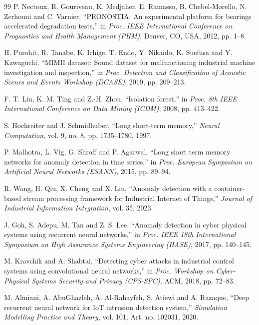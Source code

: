 \begin{thebibliography}{99}
 P. Nectoux, R. Gouriveau, K. Medjaher, E. Ramasso, B. Chebel-Morello, N. Zerhouni and C. Varnier, ``PRONOSTIA: An experimental platform for bearings accelerated degradation tests,'' in \emph{Proc. IEEE International Conference on Prognostics and Health Management (PHM)}, Denver, CO, USA, 2012, pp. 1--8.

 H. Purohit, R. Tanabe, K. Ichige, T. Endo, Y. Nikaido, K. Suefusa and Y. Kawaguchi, ``MIMII dataset: Sound dataset for malfunctioning industrial machine investigation and inspection,'' in \emph{Proc. Detection and Classification of Acoustic Scenes and Events Workshop (DCASE)}, 2019, pp. 209--213.

 F. T. Liu, K. M. Ting and Z.-H. Zhou, ``Isolation forest,'' in \emph{Proc. 8th IEEE International Conference on Data Mining (ICDM)}, 2008, pp. 413--422.

 S. Hochreiter and J. Schmidhuber, ``Long short-term memory,'' \emph{Neural Computation}, vol. 9, no. 8, pp. 1735--1780, 1997.

 P. Malhotra, L. Vig, G. Shroff and P. Agarwal, ``Long short term memory networks for anomaly detection in time series,'' in \emph{Proc. European Symposium on Artificial Neural Networks (ESANN)}, 2015, pp. 89--94.

 R. Wang, H. Qiu, X. Cheng and X. Liu, ``Anomaly detection with a container-based stream processing framework for Industrial Internet of Things,'' \emph{Journal of Industrial Information Integration}, vol. 35, 2023.

 J. Goh, S. Adepu, M. Tan and Z. S. Lee, ``Anomaly detection in cyber physical systems using recurrent neural networks,'' in \emph{Proc. IEEE 18th International Symposium on High Assurance Systems Engineering (HASE)}, 2017, pp. 140--145.

 M. Kravchik and A. Shabtai, ``Detecting cyber attacks in industrial control systems using convolutional neural networks,'' in \emph{Proc. Workshop on Cyber-Physical Systems Security and Privacy (CPS-SPC)}, ACM, 2018, pp. 72--83.

 M. Almiani, A. AbuGhazleh, A. Al-Rahayfeh, S. Atiewi and A. Razaque, ``Deep recurrent neural network for IoT intrusion detection system,'' \emph{Simulation Modelling Practice and Theory}, vol. 101, Art. no. 102031, 2020.


\end{thebibliography}
